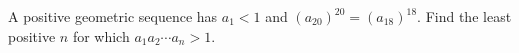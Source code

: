 A positive geometric sequence has $a_1<1$ and $(a_{20})^{20}=(a_{18})^{18}$. Find the least positive $n$ for which $a_1a_2\cdots a_n>1$.

